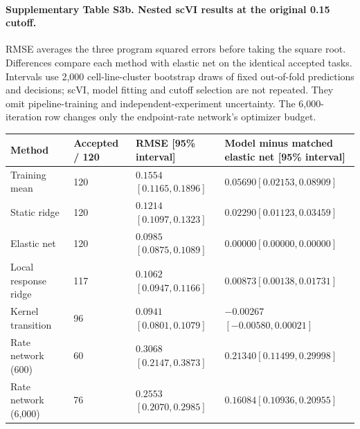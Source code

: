 \documentclass[a4paper,fleqn]{cas-sc}
\makeatletter
\DeclareRobustCommand{\rev}[1]{{\color{red}\def\@citecolor{black}\def\@linkcolor{red}\def\@urlcolor{red}#1}}
\makeatother
\begin{document}
\paragraph{Supplementary Table S3b. Nested scVI results at the original 0.15 cutoff.}
RMSE averages the three program squared errors before taking the square root. Differences compare each method with elastic net on the identical accepted tasks. Intervals use 2,000 cell-line-cluster bootstrap draws of fixed out-of-fold predictions and decisions; scVI, model fitting and cutoff selection are not repeated. They omit pipeline-training and independent-experiment uncertainty. The 6,000-iteration row changes only the endpoint-rate network's optimizer budget.
\small
\begin{longtable}{p{}p{}p{}p{}}
\toprule
\rev{Method} & \rev{Accepted / 120} & \rev{RMSE [95\% interval]} & \rev{Model minus matched elastic net [95\% interval]}\\
\midrule
\endhead
\rev{Training mean} & \rev{120} & \rev{$0.1554$\newline$[0.1165,0.1896]$} & \rev{$0.05690$\newline$[0.02153,0.08909]$}\\
\rev{Static ridge} & \rev{120} & \rev{$0.1214$\newline$[0.1097,0.1323]$} & \rev{$0.02290$\newline$[0.01123,0.03459]$}\\
\rev{Elastic net} & \rev{120} & \rev{$0.0985$\newline$[0.0875,0.1089]$} & \rev{$0.00000$\newline$[0.00000,0.00000]$}\\
\rev{Local response ridge} & \rev{117} & \rev{$0.1062$\newline$[0.0947,0.1166]$} & \rev{$0.00873$\newline$[0.00138,0.01731]$}\\
\rev{Kernel transition} & \rev{96} & \rev{$0.0941$\newline$[0.0801,0.1079]$} & \rev{$-0.00267$\newline$[-0.00580,0.00021]$}\\
\rev{Rate network (600)} & \rev{60} & \rev{$0.3068$\newline$[0.2147,0.3873]$} & \rev{$0.21340$\newline$[0.11499,0.29998]$}\\
\rev{Rate network (6,000)} & \rev{76} & \rev{$0.2553$\newline$[0.2070,0.2985]$} & \rev{$0.16084$\newline$[0.10936,0.20955]$}\\
\bottomrule
\end{longtable}
\normalsize
\end{document}
